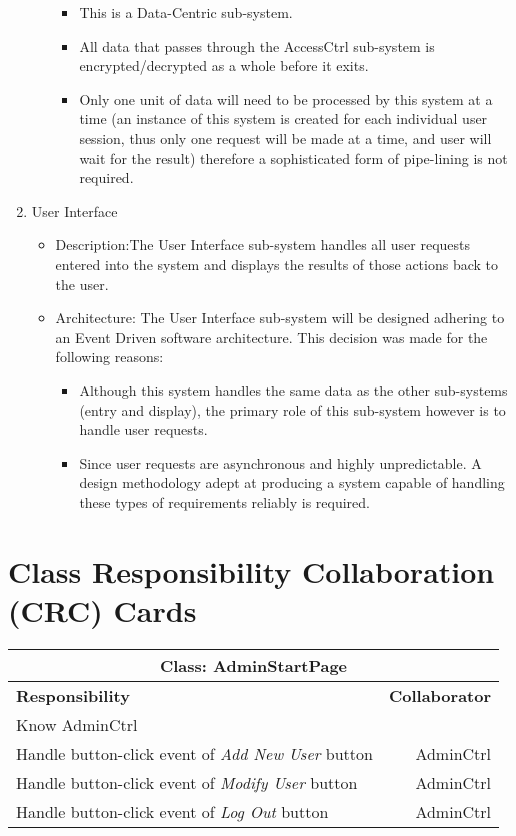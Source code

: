 \documentclass[12pt]{article}
\begin{document}
\begin{enumerate}
\begin{itemize}
\begin{itemize}
\item This is a Data-Centric sub-system.
\item All data that passes through the AccessCtrl sub-system is encrypted/decrypted as a whole before it exits.
\item Only one unit of data will need to be processed by this system at a time (an instance of this system is created for each individual user session, thus only one request will be made at a time, and user will wait for the result) therefore a sophisticated form of pipe-lining is not required.
\end{itemize}
\end{itemize}
\item User Interface
\begin{itemize}
\item Description:The User Interface sub-system handles all user requests entered into the system and displays the results of those actions back to the user.
\item Architecture: The User Interface sub-system will be designed adhering to an Event Driven software architecture. This decision was made for the following reasons:
\begin{itemize}
\item Although this system handles the same data as the other sub-systems (entry and display), the primary role of this sub-system however is to handle user requests.
\item Since user requests are asynchronous and highly unpredictable. A design methodology adept at producing a system capable of handling these types of requirements reliably is required. 
\end{itemize}
\end{itemize}
\end{enumerate}
\section{Class Responsibility Collaboration (CRC) Cards}

\begin{center}
\begin{tabularx}{\textwidth}{|X|r|} \hline
\multicolumn{2}{|c|}{\textbf{Class: AdminStartPage}}\\ \hline
\textbf{Responsibility} & \textbf{Collaborator} \\ \hline
Know AdminCtrl& \\ \hline
Handle button-click event of \emph{Add New User} button & AdminCtrl \\ \hline
Handle button-click event of \emph{Modify User} button & AdminCtrl \\ \hline
Handle button-click event of \emph{Log Out} button & AdminCtrl \\ \hline
\end{tabularx}
\newline\newline
\end{center}
\end{document}
